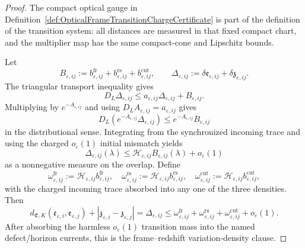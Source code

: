 \begin{proof}
The compact optical gauge in Definition~\ref{def:OpticalFrameTransitionChargeCertificate} is part of the definition of the transition system: all distances are measured in that fixed compact chart, and the multiplier map has the same compact-cone and Lipschitz bounds.

Let
\[
    B_{\varepsilon,ij}
    :=
    b^{\mathrm{fr}}_{\varepsilon,ij}
    +
    b^{\mathrm{rs}}_{\varepsilon,ij}
    +
    b^{\mathrm{cut}}_{\varepsilon,ij},
    \qquad
    \Delta_{\varepsilon,ij}
    :=
    \delta\mathfrak e_{\varepsilon,ij}+\delta\mathfrak z_{\varepsilon,ij}.
\]
The triangular transport inequality gives
\[
    D_L\Delta_{\varepsilon,ij}
    \le
    a_{\varepsilon,ij}\Delta_{\varepsilon,ij}+B_{\varepsilon,ij}.
\]
Multiplying by $e^{-A_{\varepsilon,ij}}$ and using
$D_LA_{\varepsilon,ij}=a_{\varepsilon,ij}$ gives
\[
    D_L(e^{-A_{\varepsilon,ij}}\Delta_{\varepsilon,ij})
    \le
    e^{-A_{\varepsilon,ij}}B_{\varepsilon,ij}
\]
in the distributional sense.  Integrating from the synchronized incoming trace and using the charged $o_\varepsilon(1)$ initial mismatch yields
\[
    \Delta_{\varepsilon,ij}(\lambda)
    \le
    \mathcal H_{\varepsilon,ij}B_{\varepsilon,ij}(\lambda)
    +o_\varepsilon(1)
\]
as a nonnegative measure on the overlap.  Define
\[
    \omega^{\mathrm{fr}}_{\varepsilon,ij}
    :=
    \mathcal H_{\varepsilon,ij}b^{\mathrm{fr}}_{\varepsilon,ij},
    \quad
    \omega^{\mathrm{rs}}_{\varepsilon,ij}
    :=
    \mathcal H_{\varepsilon,ij}b^{\mathrm{rs}}_{\varepsilon,ij},
    \quad
    \omega^{\mathrm{cut}}_{\varepsilon,ij}
    :=
    \mathcal H_{\varepsilon,ij}b^{\mathrm{cut}}_{\varepsilon,ij},
\]
with the charged incoming trace absorbed into any one of the three densities.  Then
\[
    d_{\mathfrak E,K}(\mathfrak e_{\varepsilon,i},\mathfrak e_{\varepsilon,j})
    +
    |\mathfrak z_{\varepsilon,i}-\mathfrak z_{\varepsilon,j}|
    =
    \Delta_{\varepsilon,ij}
    \le
    \omega^{\mathrm{fr}}_{\varepsilon,ij}
    +
    \omega^{\mathrm{rs}}_{\varepsilon,ij}
    +
    \omega^{\mathrm{cut}}_{\varepsilon,ij}
    +o_\varepsilon(1).
\]
After absorbing the harmless $o_\varepsilon(1)$ transition mass into the named defect/horizon currents, this is the frame--redshift variation-density clause.


\end{proof}
